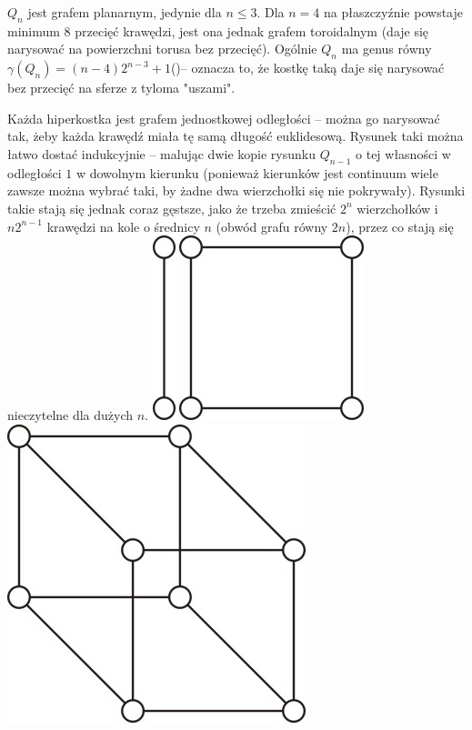 \documentclass{pracamgr}
\begin{document}
   $Q_n$ jest grafem planarnym, jedynie dla $n\le3$.\newline
   Dla $n=4$ na płaszczyźnie powstaje minimum $8$ przecięć krawędzi,
   jest ona jednak grafem toroidalnym (daje się narysować na powierzchni torusa bez przecięć).\newline
   Ogólnie $Q_n$ ma genus równy ${\gamma(Q_n)=(n-4)2^{n-3}+1}$\newline (\cite{HHH})-- oznacza to, że kostkę taką daje się
   narysować bez przecięć na sferze z tyloma "uszami".\newline\newpage
   
   Każda hiperkostka jest grafem jednostkowej odległości -- można go narysować tak, żeby każda krawędź miała tę samą długość euklidesową.
   Rysunek taki można łatwo dostać indukcyjnie -- malując dwie kopie rysunku $Q_{n-1}$ o tej własności w odległości $1$ w dowolnym kierunku
   (ponieważ kierunków jest continuum wiele zawsze można wybrać taki, by żadne dwa wierzchołki się nie pokrywały).
   Rysunki takie stają się jednak coraz gęstsze, jako że  trzeba zmieścić $2^n$ wierzchołków i $n2^{n-1}$ krawędzi na kole o średnicy $n$
   (obwód grafu równy $2n$), przez co stają się nieczytelne dla dużych $n$.\newline
   \includegraphics[scale=1]{img/unitary_1.jpg}
   \includegraphics[scale=1]{img/unitary_2.jpg}
   \includegraphics[scale=1]{img/unitary_3.jpg}
\end{document}
